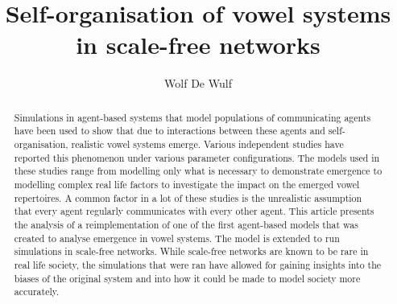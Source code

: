 \documentclass{article}
\title{\vspace{-0.8cm}Self-organisation of vowel systems in scale-free networks}
\author{Wolf De Wulf}
\date{}
\begin{document}
\maketitle

\begin{abstract}
    Simulations in agent-based systems that model populations of communicating agents have been used to show that due
    to
    interactions between these agents and self-organisation, realistic vowel systems emerge. Various independent
    studies
    have reported this phenomenon under various parameter configurations. The models used in these studies range from
    modelling only what is necessary to demonstrate emergence to modelling complex real life factors to investigate the
    impact on the emerged vowel repertoires. A common factor in a lot of these studies is the unrealistic assumption
    that
    every agent regularly communicates with every other agent. This article presents the analysis of a reimplementation
    of
    one of the first agent-based models that was created to analyse emergence in vowel systems. The model is extended
    to
    run simulations in scale-free networks. While scale-free networks are known to be rare in real life society, the
    simulations that were ran have allowed for gaining insights into the biases of the original system and into how it
    could be made to model society more accurately.
\end{abstract}
\end{document}
